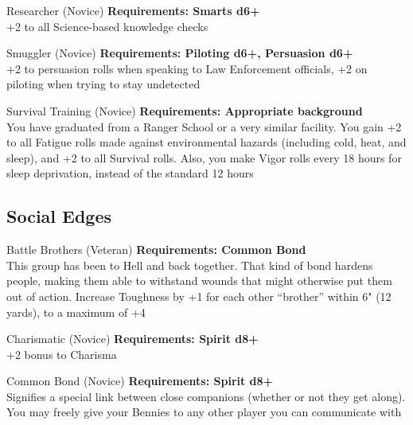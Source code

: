 \begin{multicols}{2}
\begin{genericsection}{Researcher (Novice)}
\textbf{Requirements: Smarts d6+}\\
+2 to all Science-based knowledge checks
\end{genericsection}

\begin{genericsection}{Smuggler (Novice)}
\textbf{Requirements: Piloting d6+, Persuasion d6+}\\
+2 to persuasion rolls when speaking to Law Enforcement officials, +2 on piloting when trying to stay undetected
\end{genericsection}

\begin{genericsection}{Survival Training (Novice)}
\textbf{Requirements: Appropriate background}\\
You have graduated from a Ranger School or a very similar facility. You gain +2 to all Fatigue rolls made against environmental hazards (including cold, heat, and sleep), and +2 to all Survival rolls. Also, you make Vigor rolls every 18 hours for sleep deprivation, instead of the standard 12 hours
\end{genericsection}


%
%
\subsection{Social Edges}

\begin{genericsection}{Battle Brothers (Veteran)}
\textbf{Requirements: Common Bond}\\
This group has been to Hell and back together. That kind of bond hardens people, making them able to withstand wounds that might otherwise put them out of action. Increase Toughness by +1 for each other “brother” within 6" (12 yards), to a maximum of +4
\end{genericsection}

\begin{genericsection}{Charismatic (Novice)}
\textbf{Requirements: Spirit d8+}\\
+2 bonus to Charisma
\end{genericsection}

\begin{genericsection}{Common Bond (Novice)}
\textbf{Requirements: Spirit d8+}\\
Signifies a special link between close companions (whether or not they get along). You may freely give your Bennies to any other player you can communicate with
\end{genericsection}


\end{multicols}
